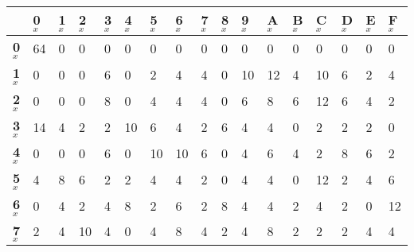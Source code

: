 \begin{longtable}[c]{|l|l|l|l|l|l|l|l|l|l|l|l|l|l|l|l|l|}
\hline
            & \textbf{0}$_x$ & \textbf{1}$_x$ & \textbf{2}$_x$ & \textbf{3}$_x$ & \textbf{4}$_x$ & \textbf{5}$_x$ & \textbf{6}$_x$ & \textbf{7}$_x$ & \textbf{8}$_x$ & \textbf{9}$_x$ & \textbf{A}$_x$ & \textbf{B}$_x$ & \textbf{C}$_x$ & \textbf{D}$_x$ & \textbf{E}$_x$ & \textbf{F}$_x$ \\ \hline
\endfirsthead
%
\endhead
%
\textbf{0}$_x$  & 64         & 0          & 0          & 0          & 0          & 0          & 0          & 0          & 0          & 0          & 0          & 0          & 0          & 0          & 0          & 0          \\ \hline
\textbf{1}$_x$  & 0          & 0          & 0          & 6          & 0          & 2          & 4          & 4          & 0          & 10         & 12         & 4          & 10         & 6          & 2          & 4          \\ \hline
\textbf{2}$_x$  & 0          & 0          & 0          & 8          & 0          & 4          & 4          & 4          & 0          & 6          & 8          & 6          & 12         & 6          & 4          & 2          \\ \hline
\textbf{3}$_x$  & 14         & 4          & 2          & 2          & 10         & 6          & 4          & 2          & 6          & 4          & 4          & 0          & 2          & 2          & 2          & 0          \\ \hline
\textbf{4}$_x$  & 0          & 0          & 0          & 6          & 0          & 10         & 10         & 6          & 0          & 4          & 6          & 4          & 2          & 8          & 6          & 2          \\ \hline
\textbf{5}$_x$  & 4          & 8          & 6          & 2          & 2          & 4          & 4          & 2          & 0          & 4          & 4          & 0          & 12         & 2          & 4          & 6          \\ \hline
\textbf{6}$_x$  & 0          & 4          & 2          & 4          & 8          & 2          & 6          & 2          & 8          & 4          & 4          & 2          & 4          & 2          & 0          & 12         \\ \hline
\textbf{7}$_x$  & 2          & 4          & 10         & 4          & 0          & 4          & 8          & 4          & 2          & 4          & 8          & 2          & 2          & 2          & 4          & 4          \\ \hline

\end{longtable}
